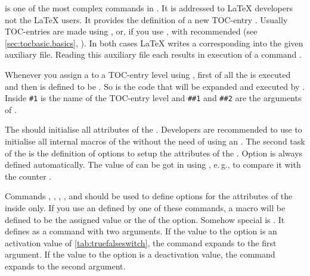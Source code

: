%
%
%
%
%
%
%
 is
one of the most complex commands in \KOMAScript. It is addressed to \LaTeX{}
developers not the \LaTeX{} users. It provides the definition of a new
TOC-entry . Usually TOC-entries are made using
, or, if you use
, with recommended
 (see
\autoref{sec:tocbasic.basics},
). In both cases \LaTeX{}
writes a corresponding  into the
given auxiliary file. Reading this auxiliary file each 
results in execution of a command .

Whenever you assign a  to a TOC-entry level using
, first of all the  is
executed and then  is defined to be
. So  is the code that will be
expanded and executed by . Inside
 \texttt{\#1} is the name of the TOC-entry level and
\texttt{\#\#1} and \texttt{\#\#2} are the arguments of
.

The  should initialise all attributes of the
. Developers are recommended to use  to
initialise all internal macros of the  without the need of
using an . The second task of the  is
the definition of options to setup the attributes of the . Option
 is always defined automatically. The value of 
can be got in  using
%
, e.\,g., to compare it with
the counter .

Commands ,
, ,
, and 
should be used to define options for the attributes of the
 inside  only. If you use an 
defined by one of these commands, a macro  will be defined to be the assigned value or the
 of the option. Somehow special is
. It defines  as a command with two arguments. If the value to
the option is an activation value of \autoref{tab:truefalseswitch},
 the command expands to the first
argument. If the value to the option is a deactivation value, the command
expands to the second argument.

